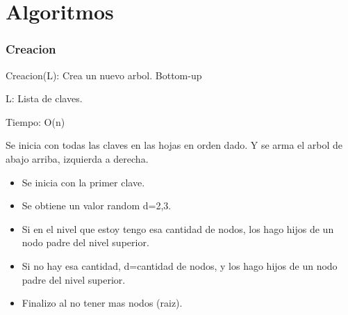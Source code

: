 \documentclass[10pt]{beamer}
\begin{document}

\section{Algoritmos}
\begin{frame}
\frametitle{Creacion}

  Creacion(L): Crea un nuevo arbol. Bottom-up

  L: Lista de claves.

  Tiempo: O(n)

  Se inicia con todas las claves en las hojas en orden dado.
  Y se arma el arbol de abajo arriba, izquierda a derecha.

\begin{itemize}
  \item Se inicia con la primer clave.
  \item Se obtiene un valor random d={2,3}.
  \item Si en el nivel que estoy tengo esa cantidad de nodos, los hago hijos de
    un nodo padre del nivel superior.
  \item Si no hay esa cantidad, d=cantidad de nodos, y los hago hijos de un nodo
    padre del nivel superior.
  \item Finalizo al no tener mas nodos (raiz).
\end{itemize}

\end{frame}

\end{document}
